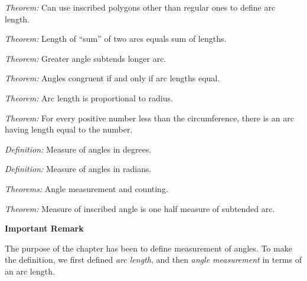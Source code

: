 \documentclass[11pt]{book}
\theoremstyle{bkplain}
\theoremstyle{XIplainnote}
\theoremstyle{bkplain}
\theoremstyle{bkplain}
\begin{document}
\begin{exercisecols}
\noindent\emph{Theorem:} Can use inscribed polygons other than regular ones to
define arc length.

\noindent\emph{Theorem:} Length of ``sum'' of two arcs equals sum of lengths.

\noindent\emph{Theorem:} Greater angle subtends longer arc.

\noindent\emph{Theorem:} Angles congruent if and only if arc lengths equal.

\noindent\emph{Theorem:} Arc length is proportional to radius.

\noindent\emph{Theorem:} For every positive number less than the circumference,
there is an arc having length equal to the number.

\noindent\emph{Definition:} Measure of angles in degrees.

\noindent\emph{Definition:} Measure of angles in radians.

\noindent\emph{Theorems:} Angle measurement and counting.

\noindent\emph{Theorem:} Measure of inscribed angle is one half measure of
subtended arc.

\par\medskip
\begin{center}\bfseries Important Remark\end{center}
\nopagebreak

The purpose of the chapter has been to define measurement of angles. To make the
definition, we first defined \emph{arc length}, and then \emph{angle
measurement} in terms of an arc length.


\end{exercisecols}
\end{document}

